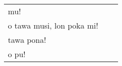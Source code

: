 \begin{supertabular}{p{5,5cm}|ll}
    mu!                       &  & \\ %
    o tawa musi, lon poka mi! &  & \\ %
    tawa pona!                &  & \\ %
    o pu!                     &  & \\ %
\end{supertabular}

%
